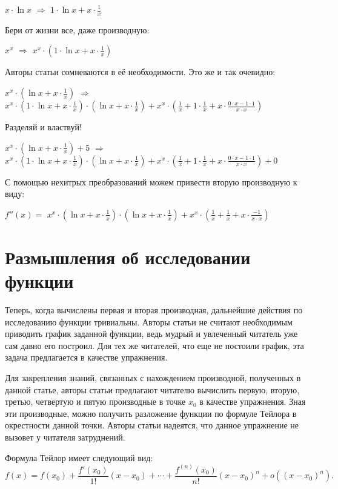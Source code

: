 \documentclass{article}
\begin{document}
$x \cdot  \ln x$ $\Rightarrow$ $1 \cdot  \ln x + x \cdot \frac{1}{x}$

Бери от жизни все, даже производную:

$x ^ {x}$ $\Rightarrow$ $x ^ {x} \cdot (1 \cdot  \ln x + x \cdot \frac{1}{x})$

Авторы статьи сомневаются в её необходимости. Это же и так очевидно:

$x ^ {x} \cdot ( \ln x + x \cdot \frac{1}{x})$ $\Rightarrow$ $x ^ {x} \cdot (1 \cdot  \ln x + x \cdot \frac{1}{x}) \cdot ( \ln x + x \cdot \frac{1}{x}) + x ^ {x} \cdot (\frac{1}{x} + 1 \cdot \frac{1}{x} + x \cdot \frac{0 \cdot x - 1 \cdot 1}{x \cdot x})$

Разделяй и властвуй!

$x ^ {x} \cdot ( \ln x + x \cdot \frac{1}{x}) + 5$ $\Rightarrow$ $x ^ {x} \cdot (1 \cdot  \ln x + x \cdot \frac{1}{x}) \cdot ( \ln x + x \cdot \frac{1}{x}) + x ^ {x} \cdot (\frac{1}{x} + 1 \cdot \frac{1}{x} + x \cdot \frac{0 \cdot x - 1 \cdot 1}{x \cdot x}) + 0$

С помощью нехитрых преобразований можем привести вторую производную к виду:

$f''(x) = $ $x ^ {x} \cdot ( \ln x + x \cdot \frac{1}{x}) \cdot ( \ln x + x \cdot \frac{1}{x}) + x ^ {x} \cdot (\frac{1}{x} + \frac{1}{x} + x \cdot \frac{-1}{x \cdot x})$

\section{Размышления об исследовании функции}

Теперь, когда вычислены первая и вторая производная, дальнейшие действия по исследованию функции тривиальны. Авторы статьи не считают необходимым приводить график заданной функции, ведь мудрый и увлеченный читатель уже сам давно его построил. Для тех же читателей, что еще не постоили график, эта задача предлагается в качестве упражнения.

Для закрепления знаний, связанных с нахождением производной, полученных в данной статье, авторы статьи предлагают читателю вычислить первую, вторую, третью, четвертую и пятую производные в точке $x_0$ в качестве упражнения. Зная эти производные, можно получить разложение функции по формуле Тейлора в окрестности данной точки. Авторы статьи надеятся, что данное упражнение не вызовет у читателя затруднений.

Формула Тейлор имеет следующий вид:
$$f(x) = f(x_0) + \frac{f'(x_0)}{1!}(x - x_0) + \cdots + \frac{f^{(n)}(x_0)}{n!}(x - x_0)^n + o((x - x_0)^n).$$
\end{document}
